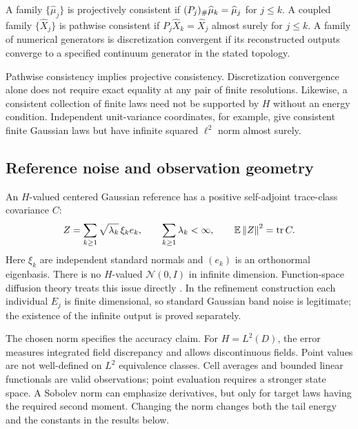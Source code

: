 \begin{definition}\label{def:consistency}
A family $\{\widehat\mu_j\}$ is projectively consistent if $(P_j)_{\#}\widehat\mu_k=\widehat\mu_j$ for $j\le k$. A coupled family $\{\widehat X_j\}$ is pathwise consistent if $P_j\widehat X_k=\widehat X_j$ almost surely for $j\le k$. A family of numerical generators is discretization convergent if its reconstructed outputs converge to a specified continuum generator in the stated topology.
\end{definition}
Pathwise consistency implies projective consistency. Discretization convergence alone does not require exact equality at any pair of finite resolutions. Likewise, a consistent collection of finite laws need not be supported by $H$ without an energy condition. Independent unit-variance coordinates, for example, give consistent finite Gaussian laws but have infinite squared $\ell^2$ norm almost surely.

\subsection{Reference noise and observation geometry}
An $H$-valued centered Gaussian reference has a positive self-adjoint trace-class covariance $C$:
\begin{equation}\label{eq:gaussian-noise}
 Z=\sum_{k\ge1}\sqrt{\lambda_k}\,\xi_ke_k,
 \qquad \sum_{k\ge1}\lambda_k<\infty,
 \qquad \mathbb E\left\lVert Z\right\rVert^2=\operatorname{tr} C.
\end{equation}
Here $\xi_k$ are independent standard normals and $(e_k)$ is an orthonormal eigenbasis. There is no $H$-valued $\mathcal N(0,I)$ in infinite dimension. Function-space diffusion theory treats this issue directly \citep{pidstrigach2025,lim2025}. In the refinement construction each individual $E_j$ is finite dimensional, so standard Gaussian band noise is legitimate; the existence of the infinite output is proved separately.

The chosen norm specifies the accuracy claim. For $H=L^2(D)$, the error measures integrated field discrepancy and allows discontinuous fields. Point values are not well-defined on $L^2$ equivalence classes. Cell averages and bounded linear functionals are valid observations; point evaluation requires a stronger state space. A Sobolev norm can emphasize derivatives, but only for target laws having the required second moment. Changing the norm changes both the tail energy and the constants in the results below.
